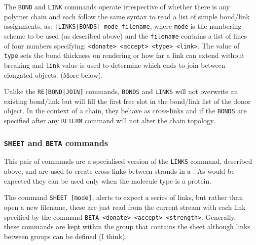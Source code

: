 The {\tt BOND} and {\tt LINK} commands operate irrespective of whether there is any polymer chain
and each follow the same syntax to read a list of simple bond/link assignments, as:
{\tt [LINKS|BONDS] mode filename}, where {\tt mode} is the numbering scheme to be used (as described
above) and the {\tt filename} contains a list of lines of four numbers specifying:
{\tt <donate> <accept> <type> <link>}.   The value of {\tt type} sets the bond thickness on
rendering or how far a link can extend without breaking and {\tt link} value is used to determine
which ends to join between elongated objects.  (More below).

Unlike the {\tt RE[BOND|JOIN]} commands, {\tt BONDS} and {\tt LINKS} will not
overwrite an existing bond/link but will fill the first free slot in the bond/link list of the
donor object.   In the context of a chain, they behave as cross-links and if the {\tt BONDS} are
specified after any {\tt RETERM} command will not alter the chain topology.

\subsubsection{{\tt SHEET} and {\tt BETA} commands}

This pair of commands are a specialised version of the {\tt LINKS} command, described above,
and are used to create cross-links between strands in a \BS.   As would be expected they can
be used only when the molecule type is a protein.

The command {\tt SHEET [mode]}, alerts  to expect a series of links, but rather than
open a new filename, these are just read from the current stream with each link specified by the
command {\tt BETA <donate> <accept> <strength>}.   Generally, these commands are kept within
the group that contains the sheet although links between groups can be defined (I think).

